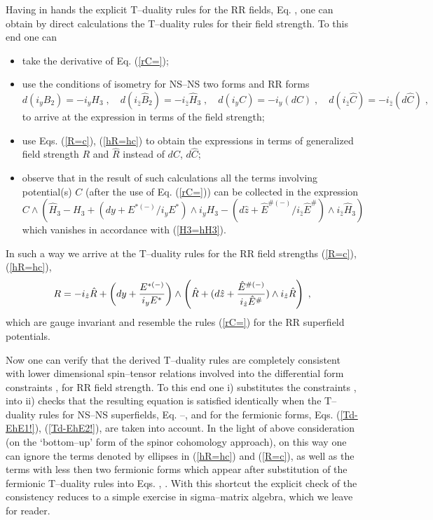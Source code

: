 \documentclass[a4paper,11pt]{article}
\begin{document}
Having in hands the explicit T--duality rules for the RR fields, 
Eq. , one can 
obtain by direct calculations the T--duality rules for their field strength.
To this end one can  
\begin{itemize}
\item 
take the derivative of Eq. (\ref{rC=});  
\item use  the conditions of isometry for 
NS--NS two forms and RR forms 
$$ d(i_y B_2)= - i_y H_3\; , \quad 
d(i_{\hat{z}} \hat{B}_2)= - i_{\hat{z}} \hat{H}_3\; , \quad 
d(i_{y} {C})= - i_{y} (d{C})\; , \quad  
d(i_{\hat{z}} \hat{C})= - i_{\hat{z}} (d\hat{C})\; , $$ 
to arrive at the expression in terms of the field strength; 
\item use Eqs. 
(\ref{R=c}), (\ref{hR=hc}) to obtain the expressions in terms 
of generalized field strength 
$R$ and  $\hat{R}$ instead of $dC$, $d\hat{C}$; 
\item observe that in the result of such calculations
all the terms involving potential(s) $C$ (after the use 
of Eq. (\ref{rC=})) 
can be collected in the expression 
$$ C \wedge \left(\hat{H}_3 - H_3 + 
(dy+ E^{ {*}(-)}/i_y E^{ {*}}) 
\wedge i_y H_3- (d\hat{z} + 
\hat{E}^{ {\#}(-)}/ i_{\hat{z}}\hat{E}^{ {\#}}) 
\wedge i_{\hat{z}}\hat{H}_3\right) $$ 
which vanishes in accordance with (\ref{H3=hH3}). 
\end{itemize} 
In such a way we arrive at the T--duality rules for the RR field strengths 
(\ref{R=c}), (\ref{hR=hc}),  
\begin{eqnarray}
  \label{R=hR} 
R =  -  i_{\hat{z}} \hat{R}   +  \left(dy +  
{E^{ {*}(-)}\over i_y E^{ {*}}}\right)\wedge 
\left(\hat{R} + (d\hat{z} + 
{\hat{E}^{ {\#}(-)}\over i_{\hat{z}}\hat{E}^{ {\#}}})
\wedge i_{\hat{z}} \hat{R} \right) \; ,
\end{eqnarray}
which are gauge invariant and resemble the rules 
(\ref{rC=}) for the RR superfield potentials.


Now one can verify that the derived T--duality rules are completely 
consistent  with lower dimensional spin--tensor relations involved into the 
differential form constraints ,  for RR field strength. 
To this end one i) substitutes the constraints  
,  into 
 ii) checks that the resulting equation is satisfied  identically
when the T--duality rules for NS--NS superfields, Eq. 
--,  and for the 
fermionic forms, Eqs.  
(\ref{Td-EhE1!}), (\ref{Td-EhE2!}), 
are taken into account. 
In the light of above consideration (on the `bottom--up' form of 
the spinor cohomology approach), on this way one can 
ignore the terms denoted by ellipses in (\ref{hR=hc}) and (\ref{R=c}), 
as well as the terms with less then two fermionic forms which appear 
after substitution of the fermionic T--duality rules into Eqs.   
, . With this shortcut the explicit check of the consistency 
reduces to a simple exercise in sigma--matrix algebra, which we leave 
for reader. 
\end{document}
